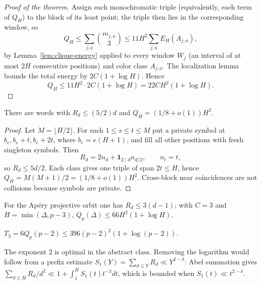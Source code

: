 \begin{proof}[Proof of the theorem]
Assign each monochromatic triple (equivalently, each term of $Q_H$) to the
block of its least point; the triple then lies in the corresponding window, so
\[
Q_H\leq\sum_{j,a}\binom{m_{j,a}}3\leq11H^2\sum_{j,a}E_H(A_{j,a}),
\]
by Lemma~\ref{lem:clique-energy} applied to every window $W_j$ (an interval of
at most $2H$ consecutive positions) and color class $A_{j,a}$. The
localization lemma bounds the total energy by $2C(1+\log H)$. Hence
\[
Q_H\leq 11H^2\cdot2C(1+\log H)=22CH^2(1+\log H).
\]
\end{proof}

\begin{proposition}[Sharpness]\label{prop:word-lower}
There are words with $R_d\leq(5/2)d$ and
$Q_H=(1/8+o(1))H^2$.
\end{proposition}

\begin{proof}
Let $M=\lfloor H/2\rfloor$. For each $1\leq s\leq t\leq M$ put a private
symbol at $b_e,b_e+t,b_e+2t$, where $b_e=e(H+1)$, and fill all other
positions with fresh singleton symbols. Then
\[
R_d=2n_d+\mathbf1_{2\mid d}n_{d/2},\qquad n_t=t,
\]
so $R_d\leq5d/2$. Each class gives one triple of span $2t\leq H$, hence
$Q_H=M(M+1)/2=(1/8+o(1))H^2$. Cross-block near coincidences are not
collisions because symbols are private.
\end{proof}

\begin{corollary}\label{cor:apery-h2}
For the Ap\'ery projective orbit one has $R_d\leq 3(d-1)$; with $C=3$ and
$H=\min(\Delta,p-3)$,
$Q_p(\Delta)\leq66H^2(1+\log H)$.
\end{corollary}

\begin{corollary}\label{cor:t3-log}
$T_3=6Q_p(p-2)\leq396(p-2)^2(1+\log(p-2))$.
\end{corollary}

\begin{remark}
The exponent $2$ is optimal in the abstract class. Removing the logarithm
would follow from a prefix estimate $S_1(Y)=\sum_{d\leq Y}R_d\ll
Y^{2-\delta}$: Abel summation gives
$\sum_{d\leq H}R_d/d^2\ll1+\int_1^H S_1(t)t^{-3}dt$, which is bounded when
$S_1(t)\ll t^{2-\delta}$.
\end{remark}

